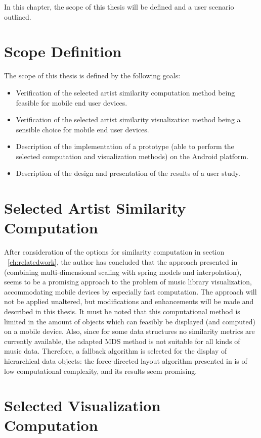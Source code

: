 In this chapter, the scope of this thesis will be defined and a user scenario outlined. 

\section{Scope Definition}

The scope of this thesis is defined by the following goals: 

\begin{itemize}
	\item Verification of the selected artist similarity computation method being feasible for mobile end user devices.
	\item Verification of the selected artist similarity visualization method being a sensible choice for mobile end user devices.
	\item Description of the implementation of a prototype (able to perform the selected computation and visualization methods) on the Android platform.
	\item Description of the design and presentation of the results of a user study.
\end{itemize}


\section{Selected Artist Similarity Computation}

After consideration of the options for similarity computation in section ~\ref{ch:relatedwork}, the author has concluded that the approach presented in \cite{Morrison:2003:FMS} (combining multi-dimensional scaling with spring models and interpolation), seems to be a promising approach to the problem of music library visualization, accommodating mobile devices by especially fast computation. The approach will not be applied unaltered, but modifications and enhancements will be made and described in this thesis. 
It must be noted that this computational method is limited in the amount of objects which can feasibly be displayed (and computed) on a mobile device. Also, since for some data structures no similarity metrics are currently available, the adapted MDS method is not suitable for all kinds of music data. Therefore, a fallback algorithm is selected for the display of hierarchical data objects: the force-directed layout algorithm presented in \cite{Kobourov04} is of low computational complexity, and its results seem promising.

\section{Selected Visualization Computation}

